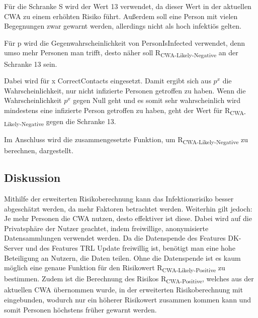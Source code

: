 \documentclass[conference,compsoc]{IEEEtran}
\begin{document}
\centerline{\text{ }}
\centerline{}
\centerline{\text{ }}

Für die Schranke S wird der Wert 13 verwendet, da dieser Wert in der aktuellen CWA zu einem erhöhten Risiko führt. 
Außerdem soll eine Person mit vielen Begegnungen zwar gewarnt werden, allerdings nicht als hoch infektiös gelten.

Für p wird die Gegenwahrscheinlichkeit von PersonIsInfected verwendet, denn umso mehr Personen man trifft, 
desto näher soll R\textsubscript{CWA-Likely-Negative} an der Schranke 13 sein. 

Dabei wird für x CorrectContacts eingesetzt. 
Damit ergibt sich aus $p^x$ die Wahrscheinlichkeit, nur nicht infizierte Personen getroffen zu haben. 
Wenn die Wahrscheinlichkeit $p^x$ gegen Null geht und es somit sehr wahrscheinlich wird mindestens eine infizierte Person getroffen zu haben,
geht der Wert für R\textsubscript{CWA-Likely-Negative} gegen die Schranke 13.

Im Anschluss wird die zusammengesetzte Funktion, um R\textsubscript{CWA-Likely-Negative} zu berechnen, dargestellt.

\centerline{\text{ }}
\centerline{}
\centerline{}
\centerline{\text{ }}

\subsection{Diskussion}\label{Bewertung_Risikoberechnung}

Mithilfe der erweiterten Risikoberechnung kann das Infektionsrisiko besser abgeschätzt werden,
da mehr Faktoren betrachtet werden. Weiterhin gilt jedoch: Je mehr Personen die CWA nutzen, desto effektiver ist diese.
Dabei wird auf die Privatsphäre der Nutzer geachtet, indem freiwillige, anonymisierte Datensammlungen verwendet werden.
Da die Datenspende des Features DK-Server und des Features TRL Update freiwillig ist, benötigt man eine hohe Beteiligung an Nutzern, die Daten teilen.
Ohne die Datenspende ist es kaum möglich eine genaue Funktion für den Risikowert R\textsubscript{CWA-Likely-Positive} zu bestimmen. 
Zudem ist die Berechnung des Risikos R\textsubscript{CWA-Positive}, welches aus der aktuellen CWA übernommen wurde,
in der erweiterten Risikoberechnung mit eingebunden, wodurch nur ein höherer Risikowert zusammen kommen kann
und somit Personen höchstens früher gewarnt werden. 
\end{document}
